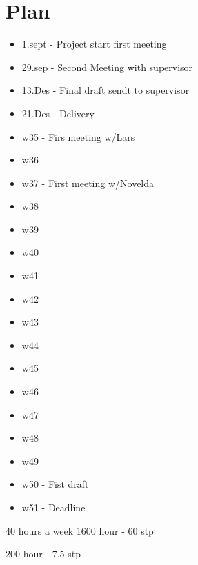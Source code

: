 \chapter{Plan}

\begin{itemize}
    \item 1.sept - Project start first meeting
    \item 29.sep - Second Meeting with supervisor
    
    \item 13.Des - Final draft sendt to supervisor
    \item 21.Des - Delivery
\end{itemize}


\begin{itemize}
    \item w35 - Firs meeting w/Lars
    \item w36
    \item w37 - First meeting w/Novelda
    \item w38
    \item w39
    \item w40
    \item w41
    \item w42
    \item w43
    \item w44
    \item w45
    \item w46
    \item w47
    \item w48
    \item w49
    \item w50 - Fist draft
    \item w51 - Deadline
    
\end{itemize}

40 hours a week
1600 hour - 60 stp

200 hour - 7.5 stp


